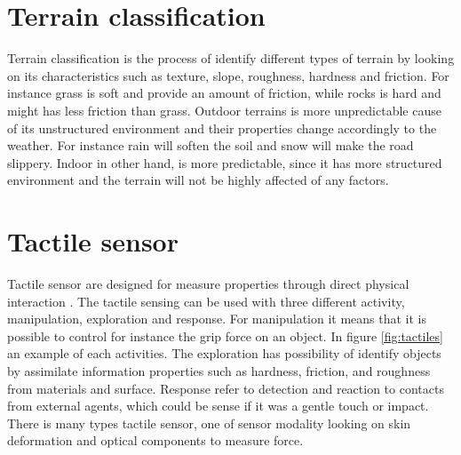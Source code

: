 \documentclass[USenglish]{ifimaster}  %
\begin{document}
\section{Terrain classification}
Terrain classification is the process of identify different types of terrain by looking on its characteristics such as texture, slope, roughness, hardness and friction. For instance grass is soft and provide an amount of friction, while rocks is hard and might has less friction than grass. Outdoor terrains is more unpredictable cause of its unstructured environment and their properties change accordingly to the weather. For instance rain will soften the soil and snow will make the road slippery. Indoor in other hand, is more predictable, since it has more structured environment and the terrain will not be highly affected of any factors.
	
	
\section{Tactile sensor}
Tactile sensor are designed for measure properties through direct physical interaction \cite{Cutkosky2008}. The tactile sensing can be used with three different activity, manipulation, exploration and response. For manipulation it means that it is possible to control for instance the grip force on an object. In figure \ref{fig:tactiles} an example of each activities. The exploration has possibility of identify objects by assimilate information properties such as hardness, friction, and roughness from materials and surface. Response refer to detection and reaction to contacts from external agents, which could be sense if it was a gentle touch or impact.  There is many types tactile sensor, one of sensor modality looking on skin deformation and optical components to measure force.
\end{document}
